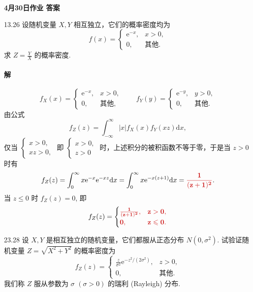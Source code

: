 \documentclass[11pt, UTF8]{ctexart}
\newcommand{\hwdate}{4月30日} %
\newcommand{\ans}[1]{\mathbf{\color{fred}#1}}
\begin{document}
\begin{center}
    {\LARGE \bfseries \color{fblue} \hwdate 作业 答案}
\end{center}

\begin{problem}{1}{3.26}
设随机变量 $X,Y$ 相互独立，它们的概率密度均为
\[ f(x) = \begin{cases} \mathrm{e}^{-x}, & x > 0, \\ 0, & \text{其他.} \end{cases} \]
求 $Z = \frac{Y}{X}$ 的概率密度.
\end{problem}

\paragraph{\color{fblue}解} 
\[ f_X(x) = \begin{cases} \mathrm{e}^{-x}, & x > 0, \\ 0, & \text{其他,} \end{cases} \qquad f_Y(y) = \begin{cases} \mathrm{e}^{-y}, & y > 0, \\ 0, & \text{其他.} \end{cases} \]
由公式
\[ f_Z(z) = \int_{-\infty}^{\infty} |x| f_X(x)f_Y(xz)\mathrm{d}x, \]
仅当 $\begin{cases} x > 0, \\ xz > 0, \end{cases}$ 即 $\begin{cases} x > 0, \\ z > 0 \end{cases}$ 时，上述积分的被积函数不等于零，于是当 $z > 0$ 时有
\[ f_Z(z) = \int_{0}^{\infty} x\mathrm{e}^{-x}\mathrm{e}^{-xz}\mathrm{d}x = \int_{0}^{\infty} x\mathrm{e}^{-x(z+1)}\mathrm{d}x = \ans{\frac{1}{(z+1)^2}}. \]
当 $z \leqslant 0$ 时 $f_Z(z) = 0$, 即
\[ f_Z(z) = \begin{cases} \ans{\frac{1}{(z+1)^2},} & \ans{z > 0,} \\ \ans{0,} & \ans{z \leqslant 0.} \end{cases} \]

\vspace{1.5em}

\begin{problem}{2}{3.28}
设 $X,Y$ 是相互独立的随机变量，它们都服从正态分布 $N(0,\sigma^2)$. 试验证随机变量 $Z = \sqrt{X^2+Y^2}$ 的概率密度为
\[ f_Z(z) = \begin{cases} \frac{z}{\sigma^2}\mathrm{e}^{-z^2/(2\sigma^2)}, & z > 0, \\ 0, & \text{其他.} \end{cases} \]
我们称 $Z$ 服从参数为 $\sigma$ $(\sigma > 0)$ 的瑞利 (Rayleigh) 分布.
\end{problem}
\end{document}
